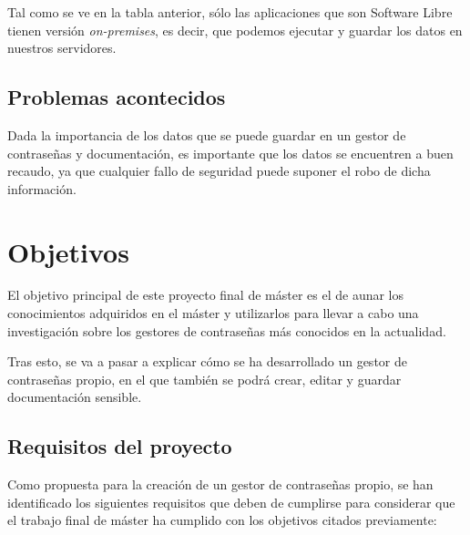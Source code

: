 \documentclass{\ClassPath/viu-tfm-template}
\begin{document}
Tal como se ve en la tabla anterior, sólo las aplicaciones que son Software Libre tienen versión \textit{on-premises}, es decir, que podemos ejecutar y guardar los datos en nuestros servidores.


\section{Problemas acontecidos}

Dada la importancia de los datos que se puede guardar en un gestor de contraseñas y documentación, es importante que los datos se encuentren a buen recaudo, ya que cualquier fallo de seguridad puede suponer el robo de dicha información.



\chapter{Objetivos}

El objetivo principal de este proyecto final de máster es el de aunar los conocimientos adquiridos en el máster y utilizarlos para llevar a cabo una investigación sobre los gestores de contraseñas más conocidos en la actualidad.

Tras esto, se va a pasar a explicar cómo se ha desarrollado un gestor de contraseñas propio, en el que también se podrá crear, editar y guardar documentación sensible.


\section{Requisitos del proyecto}
Como propuesta para la creación de un gestor de contraseñas propio, se han identificado los siguientes requisitos que deben de cumplirse para considerar que el trabajo final de máster ha cumplido con los objetivos citados previamente:
\end{document}
